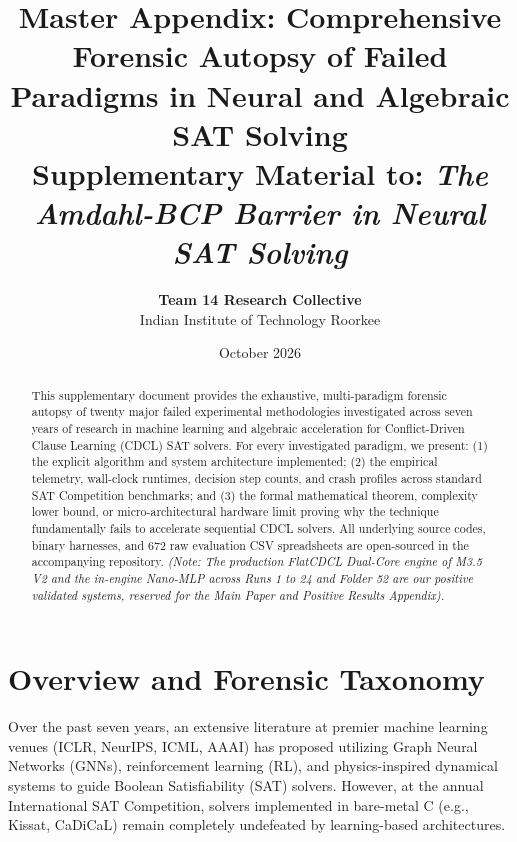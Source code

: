 \documentclass[11pt]{article}
\title{\textbf{Master Appendix: Comprehensive Forensic Autopsy of Failed Paradigms in Neural and Algebraic SAT Solving}\\
\large Supplementary Material to: \textit{The Amdahl-BCP Barrier in Neural SAT Solving}}
\author{\textbf{Team 14 Research Collective} \\ Indian Institute of Technology Roorkee}
\date{October 2026}
\theoremstyle{definition}
\begin{document}
\maketitle

\begin{abstract}
This supplementary document provides the exhaustive, multi-paradigm forensic autopsy of twenty major failed experimental methodologies investigated across seven years of research in machine learning and algebraic acceleration for Conflict-Driven Clause Learning (CDCL) SAT solvers. For every investigated paradigm, we present: (1) the explicit algorithm and system architecture implemented; (2) the empirical telemetry, wall-clock runtimes, decision step counts, and crash profiles across standard SAT Competition benchmarks; and (3) the formal mathematical theorem, complexity lower bound, or micro-architectural hardware limit proving why the technique fundamentally fails to accelerate sequential CDCL solvers. All underlying source codes, binary harnesses, and 672 raw evaluation CSV spreadsheets are open-sourced in the accompanying repository. \textit{(Note: The production FlatCDCL Dual-Core engine of M3.5 V2 and the in-engine Nano-MLP across Runs 1 to 24 and Folder 52 are our positive validated systems, reserved for the Main Paper and Positive Results Appendix).}
\end{abstract}

\tableofcontents
\newpage

\section{Overview and Forensic Taxonomy}

Over the past seven years, an extensive literature at premier machine learning venues (ICLR, NeurIPS, ICML, AAAI) has proposed utilizing Graph Neural Networks (GNNs), reinforcement learning (RL), and physics-inspired dynamical systems to guide Boolean Satisfiability (SAT) solvers. However, at the annual International SAT Competition, solvers implemented in bare-metal C (e.g., Kissat, CaDiCaL) remain completely undefeated by learning-based architectures.
\end{document}

